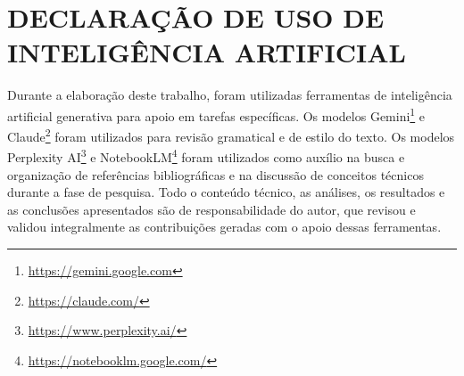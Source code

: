 \cleardoublepage
\chapter*{DECLARAÇÃO DE USO DE INTELIGÊNCIA ARTIFICIAL}
 \label{cha:declaracao-ia}

Durante a elaboração deste trabalho, foram utilizadas ferramentas de inteligência artificial generativa para apoio em tarefas específicas. Os modelos Gemini\footnote{\url{https://gemini.google.com}} e Claude\footnote{\url{https://claude.com/}} foram utilizados para revisão gramatical e de estilo do texto. Os modelos Perplexity AI\footnote{\url{https://www.perplexity.ai/}} e NotebookLM\footnote{\url{https://notebooklm.google.com/}} foram utilizados como auxílio na busca e organização de referências bibliográficas e na discussão de conceitos técnicos durante a fase de pesquisa. Todo o conteúdo técnico, as análises, os resultados e as conclusões apresentados são de responsabilidade do autor, que revisou e validou integralmente as contribuições geradas com o apoio dessas ferramentas.